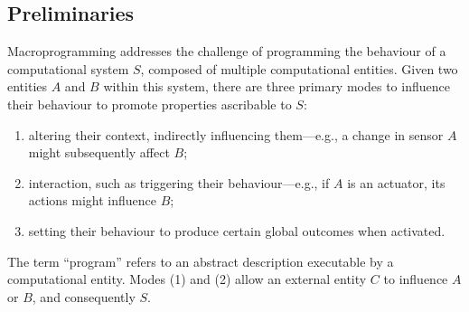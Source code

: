 \subsection{Preliminaries}
Macroprogramming addresses the challenge of programming the behaviour of a computational system \( S \), composed of multiple computational entities. 
 Given two entities \( A \) and \( B \) within this system, 
 there are three primary modes to influence their behaviour to promote properties ascribable to \( S \):
\begin{enumerate}
    \item altering their context, 
    indirectly influencing them---e.g., a change in sensor \( A \) might subsequently affect \( B \);
    \item interaction, such as triggering their behaviour---e.g.,  if \( A \) is an actuator, its actions might influence \( B \);
    \item setting their behaviour to produce certain global outcomes when activated.
\end{enumerate}
The term ``program'' refers to an abstract description executable by a computational entity. 
 Modes (1) and (2) allow an external entity \( C \) to influence \( A \) or \( B \), and consequently \( S \).

